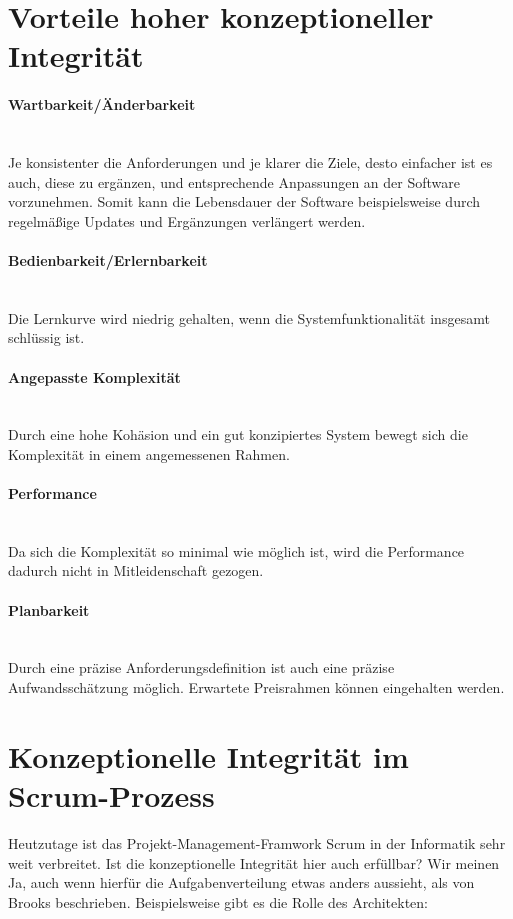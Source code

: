 \documentclass[a4paper, ngerman, 12pt, usenames, dvipsnames]{article}
\begin{document}
\section{Vorteile hoher konzeptioneller Integrität}
\paragraph{Wartbarkeit/Änderbarkeit}\mbox{} \\
Je konsistenter die Anforderungen und je klarer die Ziele, desto einfacher ist es auch, diese zu ergänzen, und entsprechende Anpassungen an der Software vorzunehmen. 
Somit kann die Lebensdauer der Software beispielsweise durch regelmäßige Updates und Ergänzungen verlängert werden.
\paragraph{Bedienbarkeit/Erlernbarkeit}\mbox{} \\
Die Lernkurve wird niedrig gehalten, wenn die Systemfunktionalität insgesamt schlüssig ist.
\paragraph{Angepasste Komplexität}\mbox{} \\
Durch eine hohe Kohäsion und ein gut konzipiertes System bewegt sich die Komplexität in einem angemessenen Rahmen.
\paragraph{Performance}\mbox{} \\
Da sich die Komplexität so minimal wie möglich ist, wird die Performance dadurch nicht in Mitleidenschaft gezogen.
\paragraph{Planbarkeit}\mbox{} \\
Durch eine präzise Anforderungsdefinition ist auch eine präzise Aufwandsschätzung möglich. Erwartete Preisrahmen können eingehalten werden.

\section{Konzeptionelle Integrität im Scrum-Prozess}
Heutzutage ist das Projekt-Management-Framwork Scrum in der Informatik sehr weit verbreitet. Ist die konzeptionelle Integrität hier auch erfüllbar?
    Wir meinen Ja, auch wenn hierfür die Aufgabenverteilung etwas anders aussieht, als von Brooks beschrieben. Beispielsweise gibt es die Rolle des Architekten:
\end{document}
